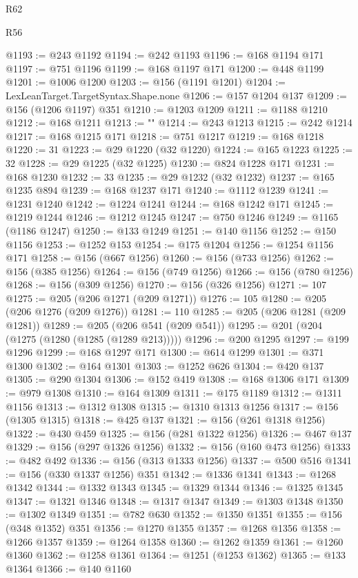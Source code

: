 \begin{lexlean}{R62}
\begin{lexlean}{R56}
\begin{coremodule}
{{{{{{{{{{{{{{{{{{{{{{{{{{{{{{{{{{{{{{{{{{{{{{{{{{{{{{{{{{{{{{{{{{{{{{{{{{{{{{{{{{{{{{{{{{{{{{{{{{{{{{{{{{{{{{{{{{{{{{{{{{{{{{{{{{{{{{{{{{{{{{{{{{{{{{{{{{{{{{{{{{{{{{{{{{{{{{{{{{{{{{{{{{{{{{{{{{{{{{{{{{{{{{{{{{{{@1193 := @243 @1192
@1194 := @242 @1193
@1196 := @168 @1194 @171
@1197 := @751 @1196
@1199 := @168 @1197 @171
@1200 := @448 @1199
@1201 := @1006 @1200
@1203 := @156 (@1191 @1201)
@1204 := LexLeanTarget.TargetSyntax.Shape.none
@1206 := @157 @1204 @137
@1209 := @156 (@1206 @1197) @351
@1210 := @1203 @1209
@1211 := @1188 @1210
@1212 := @168 @1211
@1213 := "}"
@1214 := @243 @1213
@1215 := @242 @1214
@1217 := @168 @1215 @171
@1218 := @751 @1217
@1219 := @168 @1218
@1220 := 31
@1223 := @29 @1220 (@32 @1220)
@1224 := @165 @1223
@1225 := 32
@1228 := @29 @1225 (@32 @1225)
@1230 := @824 @1228 @171
@1231 := @168 @1230
@1232 := 33
@1235 := @29 @1232 (@32 @1232)
@1237 := @165 @1235 @894
@1239 := @168 @1237 @171
@1240 := @1112 @1239
@1241 := @1231 @1240
@1242 := @1224 @1241
@1244 := @168 @1242 @171
@1245 := @1219 @1244
@1246 := @1212 @1245
@1247 := @750 @1246
@1249 := @1165 (@1186 @1247)
@1250 := @133 @1249
@1251 := @140 @1156
@1252 := @150 @1156
@1253 := @1252 @153
@1254 := @175 @1204
@1256 := @1254 @1156 @171
@1258 := @156 (@667 @1256)
@1260 := @156 (@733 @1256)
@1262 := @156 (@385 @1256)
@1264 := @156 (@749 @1256)
@1266 := @156 (@780 @1256)
@1268 := @156 (@309 @1256)
@1270 := @156 (@326 @1256)
@1271 := 107
@1275 := @205 (@206 @1271 (@209 @1271))
@1276 := 105
@1280 := @205 (@206 @1276 (@209 @1276))
@1281 := 110
@1285 := @205 (@206 @1281 (@209 @1281))
@1289 := @205 (@206 @541 (@209 @541))
@1295 := @201 (@204 (@1275 (@1280 (@1285 (@1289 @213)))))
@1296 := @200 @1295
@1297 := @199 @1296
@1299 := @168 @1297 @171
@1300 := @614 @1299
@1301 := @371 @1300
@1302 := @164 @1301
@1303 := @1252 @626
@1304 := @420 @137
@1305 := @290 @1304
@1306 := @152 @419
@1308 := @168 @1306 @171
@1309 := @979 @1308
@1310 := @164 @1309
@1311 := @175 @1189
@1312 := @1311 @1156
@1313 := @1312 @1308
@1315 := @1310 @1313 @1256
@1317 := @156 (@1305 @1315)
@1318 := @425 @137
@1321 := @156 (@261 @1318 @1256)
@1322 := @430 @459
@1325 := @156 (@281 @1322 @1256)
@1326 := @467 @137
@1329 := @156 (@297 @1326 @1256)
@1332 := @156 (@160 @473 @1256)
@1333 := @482 @492
@1336 := @156 (@313 @1333 @1256)
@1337 := @500 @516
@1341 := @156 (@330 @1337 @1256) @351
@1342 := @1336 @1341
@1343 := @1268 @1342
@1344 := @1332 @1343
@1345 := @1329 @1344
@1346 := @1325 @1345
@1347 := @1321 @1346
@1348 := @1317 @1347
@1349 := @1303 @1348
@1350 := @1302 @1349
@1351 := @782 @630
@1352 := @1350 @1351
@1355 := @156 (@348 @1352) @351
@1356 := @1270 @1355
@1357 := @1268 @1356
@1358 := @1266 @1357
@1359 := @1264 @1358
@1360 := @1262 @1359
@1361 := @1260 @1360
@1362 := @1258 @1361
@1364 := @1251 (@1253 @1362)
@1365 := @133 @1364
@1366 := @140 @1160
}}}}}}}}}}}}}}}}}}}}}}}}}}}}}}}}}}}}}}}}}}}}}}}}}}}}}}}}}}}}}}}}}}}}}}}}}}}}}}}}}}}}}}}}}}}}}}}}}}}}}}}}}}}}}}}}}}}}}}}}}}}}}}}}}}}}}}}}}}}}}}}}}}}}}}}}}}}}}}}}}}}}}}}}}}}}}}}}}}}}}}}}}}}}}}}}}}}}}}}}}}}}}}}}}}}
\end{coremodule}
\end{lexlean}
\end{lexlean}
